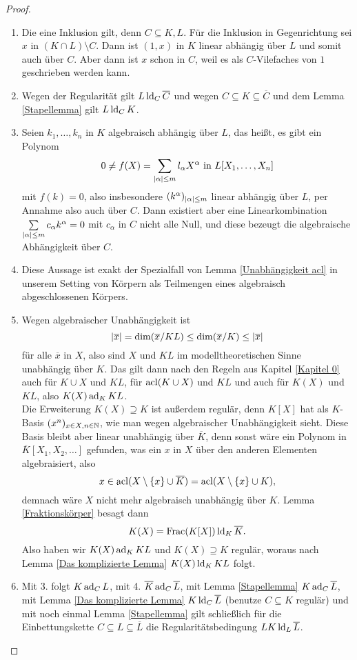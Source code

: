     \begin{proof}
    	\ 
    	\begin{enumerate}
    		\item Die eine Inklusion gilt, denn $C\subseteq K,L$. Für die Inklusion in Gegenrichtung sei $x$ in $(K\cap L)\setminus C$. Dann ist $(1,x)$ in $K$ linear abhängig über $L$ und somit auch über $C$. Aber dann ist $x$ schon in $C$, weil es als $C$-Vilefaches von $1$ geschrieben werden kann.
    		\item Wegen der Regularität gilt $L\operatorname{ld}_C\overline{C}$ und wegen $C\subseteq K\subseteq\overline{C}$ und dem Lemma \ref{Stapellemma} gilt $L\operatorname{ld}_C K$.
    		\item Seien $k_1,\dots,k_n$ in $K$ algebraisch abhängig über $L$, das heißt, es gibt ein Polynom $$0\neq f(X)=\sum\limits_{{\left| \alpha \right|}\leq m}l_\alpha X^\alpha\text{ in }L[X_1,\dots,X_n]$$ mit $f(k)=0$, also insbesondere $(k^\alpha)_{{\left| \alpha \right|}\leq m}$ linear abhängig über $L$, per Annahme also auch über $C$. Dann existiert aber eine Linearkombination $\sum\limits_{{\left| \alpha \right|}\leq m}c_\alpha k^\alpha=0$ mit $c_\alpha$ in $C$ nicht alle Null, und diese bezeugt die algebraische Abhängigkeit über $C$.
    		\item Diese Aussage ist exakt der Spezialfall von Lemma \ref{Unabhängigkeit acl} in unserem Setting von Körpern als Teilmengen eines algebraisch abgeschlossenen Körpers.
    		\item Wegen algebraischer Unabhängigkeit ist $${\left| \overline{x} \right|}=\dim(\overline{x}/KL)\leq\dim(\overline{x}/K)\leq{\left| \overline{x} \right|}$$ für alle $\overline{x}$ in $X$, also sind $X$ und $KL$ im modelltheoretischen Sinne unabhängig über $K$. Das gilt dann nach den Regeln aus Kapitel \ref{Kapitel 0} auch für $K\cup X$ und $KL$, für $\operatorname{acl}(K\cup X)$ und $KL$ und auch für $K(X)$ und $KL$, also $K(X)\operatorname{ad}_KKL$.\\
    		Die Erweiterung $K(X)\supseteq K$ ist außerdem regulär, denn $K[X]$ hat als $K$-Basis $(x^n)_{x\in X,n\in\mathbb{N}}$, wie man wegen algebraischer Unabhängigkeit sieht.\newpage
    		Diese Basis bleibt aber linear unabhängig über $\overline{K}$, denn sonst wäre ein Polynom in $\overline{K}[X_1,X_2,\dots]$ gefunden, was ein $x$ in $X$ über den anderen Elementen algebraisiert, also $$x\in\operatorname{acl}(X\setminus\{x\}\cup\overline{K})=\operatorname{acl}(X\setminus\{x\}\cup K),$$ demnach wäre $X$ nicht mehr algebraisch unabhängig über $K$. Lemma \ref{Fraktionskörper} besagt dann $$K(X)=\operatorname{Frac}(K[X])\operatorname{ld}_K\overline{K}.$$
    		Also haben wir $K(X)\operatorname{ad}_KKL$ und $K(X)\supseteq K$ regulär, woraus nach Lemma \ref{Das komplizierte Lemma} $K(X)\operatorname{ld}_KKL$ folgt.
    		\item Mit 3. folgt $K\operatorname{ad}_CL$, mit 4. $\overline{K}\operatorname{ad}_C\overline{L}$, mit Lemma \ref{Stapellemma} $K\operatorname{ad}_C\overline{L}$, mit Lemma \ref{Das komplizierte Lemma} $K\operatorname{ld}_C\overline{L}$ (benutze $C\subseteq K$ regulär) und mit noch einmal Lemma \ref{Stapellemma} gilt schließlich für die Einbettungskette $C\subseteq L\subseteq\overline{L}$ die Regularitätsbedingung $LK\operatorname{ld}_L\overline{L}$.
    	\end{enumerate}
    \end{proof}
    
